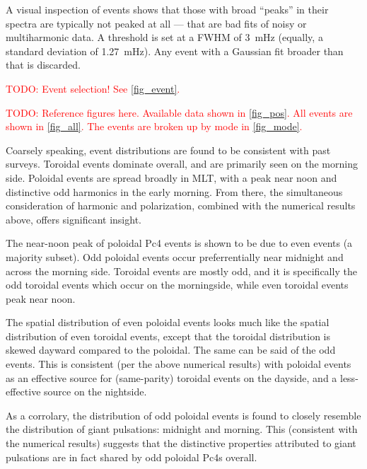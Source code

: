 \documentclass{article}
\newcommand{\todo}[1]{ \textcolor{red}{TODO: #1} }
\begin{document}
A visual inspection of events shows that those with broad ``peaks'' in their spectra are typically not peaked at all --- that are bad fits of noisy or multiharmonic data. A threshold is set at a FWHM of \SI{3}{\mHz} (equally, a standard deviation of \SI{1.27}{\mHz}). Any event with a Gaussian fit broader than that is discarded.
















\todo{Event selection! See \cref{fig_event}. }

\todo{Reference figures here. Available data shown in \cref{fig_pos}. All events are shown in \cref{fig_all}. The events are broken up by mode in \cref{fig_mode}. }

Coarsely speaking, event distributions are found to be consistent with past surveys. Toroidal events dominate overall, and are primarily seen on the morning side. Poloidal events are spread broadly in MLT, with a peak near noon and distinctive odd harmonics in the early morning. From there, the simultaneous consideration of harmonic and polarization, combined with the numerical results above, offers significant insight.

The near-noon peak of poloidal Pc4 events is shown to be due to even events (a majority subset). Odd poloidal events occur preferrentially near midnight and across the morning side. Toroidal events are mostly odd, and it is specifically the odd toroidal events which occur on the morningside, while even toroidal events peak near noon.

The spatial distribution of even poloidal events looks much like the spatial distribution of even toroidal events, except that the toroidal distribution is skewed dayward compared to the poloidal. The same can be said of the odd events. This is consistent (per the above numerical results) with poloidal events as an effective source for (same-parity) toroidal events on the dayside, and a less-effective source on the nightside.

As a corrolary, the distribution of odd poloidal events is found to closely resemble the distribution of giant pulsations: midnight and morning. This (consistent with the numerical results) suggests that the distinctive properties attributed to giant pulsations are in fact shared by odd poloidal Pc4s overall.
\end{document}

